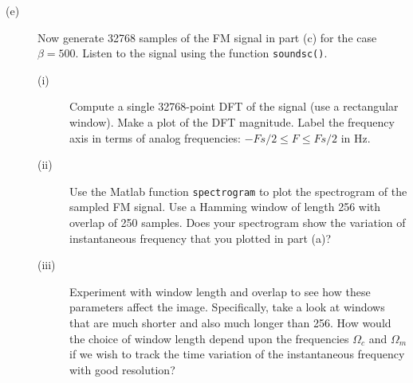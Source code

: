 \documentclass[12pt]{report}
\begin{document}
\begin{description}
	\item[(e)] Now generate 32768 samples of the FM signal in part (c) for the case $\beta = 500$. Listen to the signal using the function \texttt{soundsc()}.
	\begin{description}
		\item[(i)] Compute a single 32768-point DFT of the signal (use a rectangular window). Make a plot of the DFT magnitude. Label the frequency axis in terms of analog frequencies: $-Fs/2 \leq F \leq Fs/2$ in Hz. 

		\item[(ii)] Use the Matlab function \texttt{spectrogram} to plot the spectrogram of the sampled FM signal. Use a Hamming window of length 256 with overlap of 250 samples. Does your spectrogram show the variation of instantaneous frequency that you plotted in part (a)? 
		
		\item[(iii)] Experiment with window length and overlap to see how these parameters affect the image. Specifically, take a look at windows that are much shorter and also much longer than 256. How would the choice of window length depend upon the frequencies $\Omega_c$ and $\Omega_m$ if we wish to track the time variation of the instantaneous frequency with good resolution?
	\end{description}

\end{description}
\end{document}
